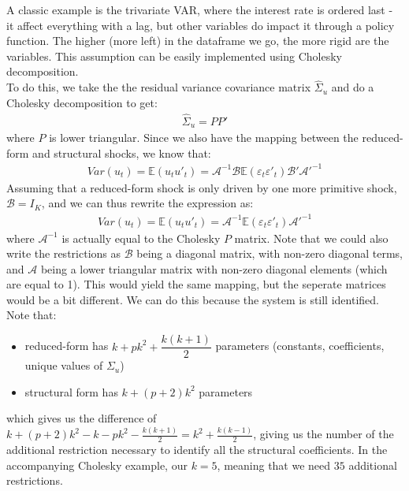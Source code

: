 \documentclass[a4paper, 12pt]{article}
\begin{document}
A classic example is the trivariate VAR, where the interest rate is ordered last - it affect everything with a lag, but other variables do impact it through a policy function. The higher (more left) in the dataframe we go, the more rigid are the variables.  
This assumption can be easily implemented using Cholesky decomposition.\\[12pt]
To do this, we take the the residual variance covariance matrix $\hat{\Sigma}_u$ and do a Cholesky decomposition to get:
\begin{equation}
\begin{aligned}
\hat{\Sigma}_u=PP'\nonumber
\end{aligned}
\end{equation}
where $P$ is lower triangular. Since we also have the mapping between the reduced-form and structural shocks, we know that:
\begin{equation}
\begin{aligned}
Var(u_t)=\mathbb{E}(u_tu'_t)=\mathcal{A}^{-1}\mathcal{B}\mathbb{E}(\varepsilon_t\varepsilon'_t)\mathcal{B}'\mathcal{A}'^{-1} \nonumber
\end{aligned}
\end{equation}
Assuming that a reduced-form shock is only driven by one more primitive shock, $\mathcal{B}=I_K$, and we can thus rewrite the expression as:
\begin{equation}
\begin{aligned}
Var(u_t)=\mathbb{E}(u_tu'_t)=\mathcal{A}^{-1}\mathbb{E}(\varepsilon_t\varepsilon'_t)\mathcal{A}'^{-1} 
\end{aligned}
\end{equation}
where $\mathcal{A}^{-1}$ is actually equal to the Cholesky $P$ matrix. Note that we could also write the restrictions as $\mathcal{B}$ being a diagonal matrix, with non-zero diagonal terms, and $\mathcal{A}$ being a lower triangular matrix with non-zero diagonal elements (which are equal to 1). 
This would yield the same mapping, but the seperate matrices would be a bit different. We can do this because the system is still identified. Note that:
\begin{itemize}
\item reduced-form has $k+pk^2+\dfrac{k(k+1)}{2}$ parameters (constants, coefficients, unique values of $\Sigma_u$)
\item structural form has $k+(p+2)k^2$ parameters
\end{itemize}
which gives us the difference of $k+(p+2)k^2-k-pk^2-\frac{k(k+1)}{2}=k^2+\frac{k(k-1)}{2}$, giving us the number of the additional restriction necessary to identify all the structural coefficients. In the accompanying Cholesky example, our $k=5$, meaning that we need $35$ additional restrictions.
\end{document}
